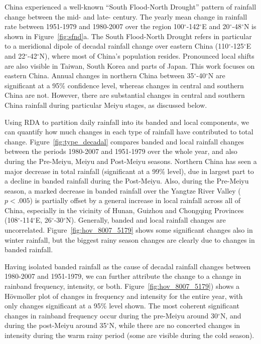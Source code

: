 \documentclass[9pt,twocolumn,twoside,lineno]{pnas-new}
\begin{document}
	China experienced a well-known ``South Flood-North Drought'' pattern of rainfall change between the mid- and late- century. The yearly mean change in rainfall rate between 1951-1979 and 1980-2007 over the region 100$^{\circ}$-142$^{\circ}$E and 20$^{\circ}$-48$^{\circ}$N is shown in Figure~\ref{fig:sfnd}a. The South Flood-North Drought refers in particular to a meridional dipole of decadal rainfall change over eastern China (110$^{\circ}$-125$^{\circ}$E and 22$^{\circ}$-42$^{\circ}$N), where most of China's population resides. Pronounced local shifts are also visible in Taiwan, South Korea and parts of Japan. This work focuses on eastern China. Annual changes in northern China between 35$^{\circ}$-40$^{\circ}$N are significant at a 95\% confidence level, whereas changes in central and southern China are not. However, there are substantial changes in central and southern China rainfall during particular Meiyu stages, as discussed below.
	
	Using RDA to partition daily rainfall into its banded and local components, we can quantify how much changes in each type of rainfall have contributed to total change. Figure~\ref{fig:type_decadal} compares banded and local rainfall changes between the periods 1980-2007 and 1951-1979 over the whole year, and also during the Pre-Meiyu, Meiyu and Post-Meiyu seasons. Northern China has seen a major decrease in total rainfall (significant at a 99\% level), due in largest part to a decline in banded rainfall during the Post-Meiyu. Also, during the Pre-Meiyu season, a marked decrease in banded rainfall over the Yangtze River Valley ($p<.005$) is partially offset by a general increase in local rainfall across all of China, especially in the vicinity of Hunan, Guizhou and Chongqing Provinces (108$^\circ$-114$^\circ$E, 26$^\circ$-30$^\circ$N). Generally, banded and local rainfall changes are uncorrelated. Figure~\ref{fig:hov_8007_5179} shows some significant changes also in winter rainfall, but the biggest rainy season changes are clearly due to changes in banded rainfall.

	Having isolated banded rainfall as the cause of decadal rainfall changes between 1980-2007 and 1951-1979, we can further attribute the change to a change in rainband frequency, intensity, or both. Figure~\ref{fig:hov_8007_5179}) shows a H\"ovmoller plot of changes in frequency and intensity for the entire year, with only changes significant at a 95\% level shown. The most coherent significant changes in rainband frequency occur during the pre-Meiyu around 30$^\circ$N, and during the post-Meiyu around 35$^\circ$N, while there are no concerted changes in intensity during the warm rainy period (some are visible during the cold season). 
	
\end{document}
